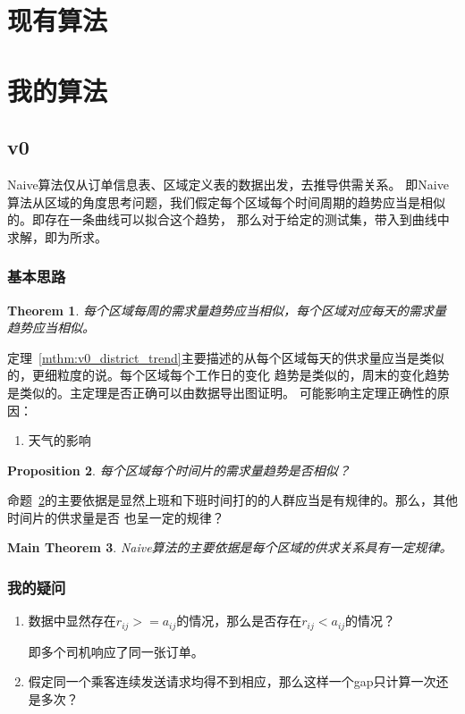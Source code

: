 \documentclass[hyperref,UTF8]{ctexart}
\newtheorem{thm}{Theorem}[subsection]
\newtheorem{prop}[thm]{Proposition}
\newtheorem{mthm}[thm]{Main Theorem}
\theoremstyle{definition}
\theoremstyle{remark}
\numberwithin{equation}{subsection}
\begin{document}
\section{现有算法}
\label{sec:current_algo}



\section{我的算法}
\label{sec:basic_thought}

\subsection{v0}

	Naive算法仅从订单信息表、区域定义表的数据出发，去推导供需关系。
	即Naive算法从区域的角度思考问题，我们假定每个区域每个时间周期的趋势应当是相似的。即存在一条曲线可以拟合这个趋势，
	那么对于给定的测试集，带入到曲线中求解，即为所求。
	
\subsubsection{基本思路}

	\begin{thm}
	\label{thm:v0_district_trend}
	每个区域每周的需求量趋势应当相似，每个区域对应每天的需求量趋势应当相似。
	\end{thm}
	
	定理~\ref{mthm:v0_district_trend}主要描述的从每个区域每天的供求量应当是类似的，更细粒度的说。每个区域每个工作日的变化
	趋势是类似的，周末的变化趋势是类似的。主定理是否正确可以由数据导出图证明。
	可能影响主定理正确性的原因：
	\begin{enumerate}[(1)]
	
		\item 天气的影响
		
	\end{enumerate}

	\begin{prop}
	\label{prop:v0_time_slice_trend}
	每个区域每个时间片的需求量趋势是否相似？
	\end{prop}
	
	命题~\ref{prop:v0_time_slice_trend}的主要依据是显然上班和下班时间打的的人群应当是有规律的。那么，其他时间片的供求量是否
	也呈一定的规律？
	
	\begin{mthm}
	\label{mthm:v0_basis}
	Naive算法的主要依据是每个区域的供求关系具有一定规律。
	\end{mthm}
	
\subsubsection{我的疑问}

	\begin{enumerate}[(1)]
		
		\item 数据中显然存在$r_{ij} >= a_{ij}$的情况，那么是否存在$r_{ij} < a_{ij}$的情况？
		
		即多个司机响应了同一张订单。
		
		\item 假定同一个乘客连续发送请求均得不到相应，那么这样一个gap只计算一次还是多次？
		
	\end{enumerate}
	
	
\end{document}
